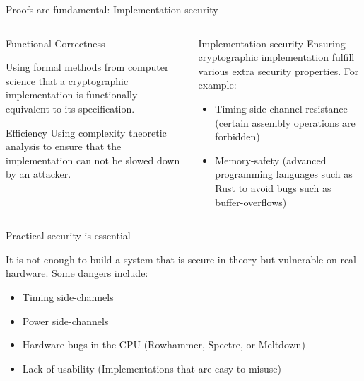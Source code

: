 \begin{frame}{Proofs are fundamental: Implementation security}
  \begin{columns}[t]

    \begin{column}{.5\linewidth}
      \begin{block}{Functional Correctness\rule[-.5\dp\strutbox]{0pt}{.5\dp\strutbox}}%
        Using formal methods from computer science that a cryptographic implementation is functionally equivalent to its specification.
      \end{block}

      \begin{block}{Efficiency}
        Using complexity theoretic analysis to ensure that the implementation can not be slowed down by an attacker.
      \end{block}
    \end{column}

    \begin{column}{.5\linewidth}
      \begin{block}{Implementation security}
        Ensuring cryptographic implementation fulfill various extra security properties.
        For example:
        \vfill
        \begin{itemize}
          \item Timing side-channel resistance (certain assembly operations are forbidden)
          \item Memory-safety (advanced programming languages such as Rust to avoid bugs such as buffer-overflows)
        \end{itemize}
      \end{block}
    \end{column}
  \end{columns}

\end{frame}

\begin{frame}{Practical security is essential}
  \small

  It is not enough to build a system that is secure in theory but vulnerable on real hardware.
  Some dangers include:

  \begin{itemize}
    \item Timing side-channels
    \item Power side-channels
    \item Hardware bugs in the CPU (Rowhammer, Spectre, or Meltdown)
    \item Lack of usability (Implementations that are easy to misuse)
  \end{itemize}
\end{frame}

